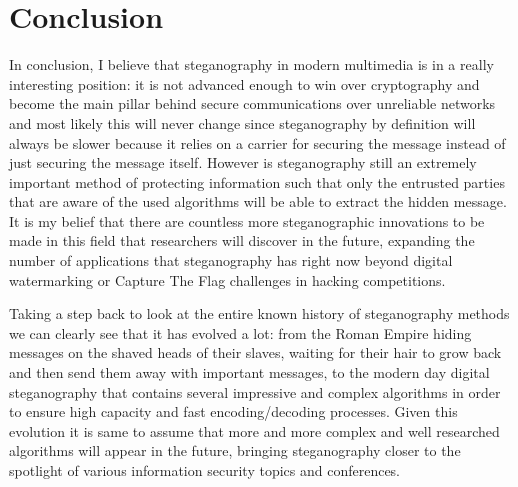 \documentclass[notitlepage]{report}
\begin{document}
\clearpage
\chapter{Conclusion}
In conclusion, I believe that steganography in modern multimedia is in a really interesting position: it is not advanced enough to win over cryptography and become the main pillar behind secure communications over unreliable networks and most likely this will never change since steganography by definition will always be slower because it relies on a carrier for securing the message instead of just securing the message itself. However is steganography still an extremely important method of protecting information such that only the entrusted parties that are aware of the used algorithms will be able to extract the hidden message. It is my belief that there are countless more steganographic innovations to be made in this field that researchers will discover in the future, expanding the number of applications that steganography has right now beyond digital watermarking or Capture The Flag challenges in hacking competitions. 

Taking a step back to look at the entire known history of steganography methods we can clearly see that it has evolved a lot: from the Roman Empire hiding messages on the shaved heads of their slaves, waiting for their hair to grow back and then send them away with important messages, to the modern day digital steganography that contains several impressive and complex algorithms in order to ensure high capacity and fast encoding/decoding processes. Given this evolution it is same to assume that more and more complex and well researched algorithms will appear in the future, bringing steganography closer to the spotlight of various information security topics and conferences.



\restoregeometry
\end{document}
